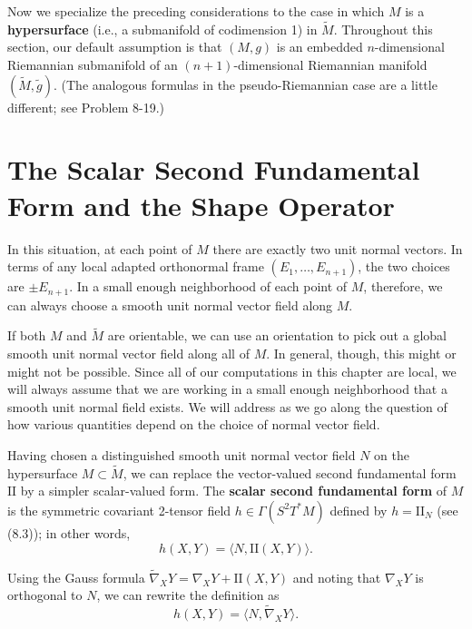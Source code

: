 Now we specialize the preceding considerations to the case in which $M$ is a \textbf{hypersurface} (i.e., a submanifold of codimension 1) in $\tilde{M}$. Throughout this section, our default assumption is that $(M, g)$ is an embedded $n$-dimensional Riemannian submanifold of an $(n + 1)$-dimensional Riemannian manifold $(\tilde{M}, \tilde{g})$. (The analogous formulas in the pseudo-Riemannian case are a little different; see Problem 8-19.)

\section{The Scalar Second Fundamental Form and the Shape Operator}

In this situation, at each point of $M$ there are exactly two unit normal vectors. In terms of any local adapted orthonormal frame $(E_1,\ldots,E_{n+1})$, the two choices are $\pm E_{n+1}$. In a small enough neighborhood of each point of $M$, therefore, we can always choose a smooth unit normal vector field along $M$.

If both $M$ and $\tilde{M}$ are orientable, we can use an orientation to pick out a global smooth unit normal vector field along all of $M$. In general, though, this might or might not be possible. Since all of our computations in this chapter are local, we will always assume that we are working in a small enough neighborhood that a smooth unit normal field exists. We will address as we go along the question of how various quantities depend on the choice of normal vector field.

Having chosen a distinguished smooth unit normal vector field $N$ on the hypersurface $M \subset \tilde{M}$, we can replace the vector-valued second fundamental form $\text{II}$ by a simpler scalar-valued form. The \textbf{scalar second fundamental form} of $M$ is the symmetric covariant 2-tensor field $h \in \Gamma(S^2 T^* M)$ defined by $h = \text{II}_N$ (see (8.3)); in other words,
\begin{equation}
h(X,Y) = \langle N, \text{II}(X,Y) \rangle.
\tag{8.8}
\end{equation}

Using the Gauss formula $\tilde{\nabla}_X Y = \nabla_X Y + \text{II}(X,Y)$ and noting that $\nabla_X Y$ is orthogonal to $N$, we can rewrite the definition as
\begin{equation}
h(X,Y) = \langle N, \tilde{\nabla}_X Y \rangle.
\tag{8.9}
\end{equation}

